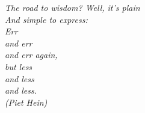\begin{epigrafe}
	\vspace*{\fill}
	\begin{flushright}
		\textit{
			The road to wisdom? Well, it's plain\\
			And simple to express:\\
			Err\\
			and err\\
			and err again,\\
			but less\\
			and less\\
			and less.\\
			(Piet Hein)
		}
	\end{flushright}
\end{epigrafe}

